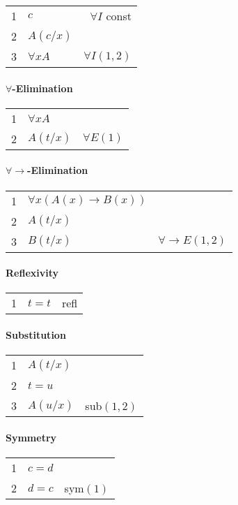\documentclass[10pt,twoside,twocolumn]{article}
\providecommand{\tabularnewline}{\\}
\begin{document}
\begin{tabular}{|llr|}
\hline 
1 & $c$ & $\forall I$ const\tabularnewline
2 & $A\left(c/x\right)$ & \tabularnewline
\hline 
\multicolumn{1}{l}{3} & $\forall xA$ & \multicolumn{1}{r}{$\forall I\left(1,2\right)$}\tabularnewline
\end{tabular}


\paragraph{$\boldsymbol{\forall}$-Elimination}

\begin{tabular}{llr}
1 & $\forall xA$ & \tabularnewline
2 & $A\left(t/x\right)$ & $\forall E\left(1\right)$\tabularnewline
\end{tabular}


\paragraph{$\boldsymbol{\forall}\rightarrow$-Elimination}

\begin{tabular}{llr}
1 & $\forall x\left(A\left(x\right)\rightarrow B\left(x\right)\right)$ & \tabularnewline
2 & $A\left(t/x\right)$ & \tabularnewline
3 & $B\left(t/x\right)$ & $\forall\rightarrow E\left(1,2\right)$\tabularnewline
\end{tabular}


\paragraph{Reflexivity}

\begin{tabular}{llr}
1 & $t=t$ & refl\tabularnewline
\end{tabular}


\paragraph{Substitution}

\begin{tabular}{llr}
1 & $A\left(t/x\right)$ & \tabularnewline
2 & $t=u$ & \tabularnewline
3 & $A\left(u/x\right)$ & sub$\left(1,2\right)$\tabularnewline
\end{tabular}


\paragraph{Symmetry}

\begin{tabular}{llr}
1 & $c=d$ & \tabularnewline
2 & $d=c$ & sym$\left(1\right)$\tabularnewline
\end{tabular}
\end{document}
